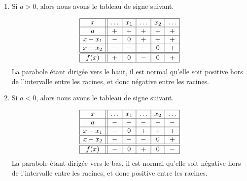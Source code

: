 \begin{enumerate}
    \item
        Si \( a>0\), alors nous avons le tableau de signe suivant.
        \begin{multicols}{2}
            \begin{equation*}
                \begin{array}[h]{|c||c|c|c|c|c|}
                    \hline
                    x&\ldots&x_1&\ldots&x_2&\ldots\\
                    \hline
                    a&+&+&+&+&+\\
                    \hline
                    x-x_1&-&0&+&+&+\\
                    \hline
                    x-x_2&-&-&-&0&+\\
                    \hline\hline
                    f(x)&+&0&-&0&+\\
                    \hline
                \end{array}
            \end{equation*}
            La parabole étant dirigée vers le haut, il est normal qu'elle soit positive hors de l'intervalle entre les racines, et donc négative entre les racines.

            \columnbreak




        \end{multicols}
    \item
        Si \( a<0\), alors nous avons le tableau de signe suivant.
        \begin{multicols}{2}
            \begin{equation*}
                \begin{array}[h]{|c||c|c|c|c|c|}
                    \hline
                    x&\ldots&x_1&\ldots&x_2&\ldots\\
                    \hline
                    a&-&-&-&-&-\\
                    \hline
                    x-x_1&-&0&+&+&+\\
                    \hline
                    x-x_2&-&-&-&0&+\\
                    \hline\hline
                    f(x)&-&0&+&0&-\\
                    \hline
                \end{array}
            \end{equation*}
            La parabole étant dirigée vers le bas, il est normal qu'elle soit négative hors de l'intervalle entre les racines, et donc positive entre les racines.


\end{multicols}
\end{enumerate}
